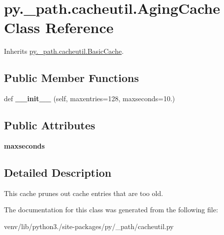 \hypertarget{classpy_1_1__path_1_1cacheutil_1_1_aging_cache}{}\section{py.\+\_\+path.\+cacheutil.\+Aging\+Cache Class Reference}
\label{classpy_1_1__path_1_1cacheutil_1_1_aging_cache}


Inherits \hyperlink{classpy_1_1__path_1_1cacheutil_1_1_basic_cache}{py.\+\_\+path.\+cacheutil.\+Basic\+Cache}.

\subsection*{Public Member Functions}
\begin{DoxyCompactItemize}
\item 
\mbox{\label{classpy_1_1__path_1_1cacheutil_1_1_aging_cache_a90a2bad06ecb526e66043ca2b4f233b4}} 
def {\bfseries \+\_\+\+\_\+init\+\_\+\+\_\+} (self, maxentries=128, maxseconds=10.)
\end{DoxyCompactItemize}
\subsection*{Public Attributes}
\begin{DoxyCompactItemize}
\item 
\mbox{\label{classpy_1_1__path_1_1cacheutil_1_1_aging_cache_a579a0ce18fa1253acd296590ddaeeb2d}} 
{\bfseries maxseconds}
\end{DoxyCompactItemize}


\subsection{Detailed Description}
\begin{DoxyVerb}This cache prunes out cache entries that are too old.
\end{DoxyVerb}
 

The documentation for this class was generated from the following file\+:\begin{DoxyCompactItemize}
\item 
venv/lib/python3./site-\/packages/py/\+\_\+path/cacheutil.\+py\end{DoxyCompactItemize}
